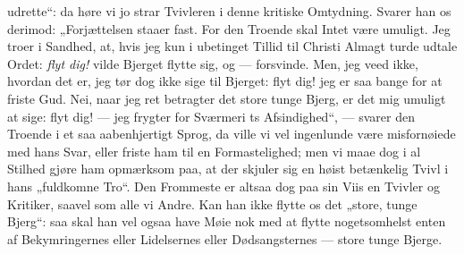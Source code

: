 \documentclass[12pt,a4paper]{book}
\begin{document}
udrette“: da høre vi jo strar Tvivleren i denne kritiske Omtydning. Svarer han os
derimod: „Forjættelsen staaer fast. For den Troende skal Intet være umuligt. Jeg troer i
Sandhed, at, hvis jeg kun i ubetinget Tillid til Christi Almagt turde udtale Ordet:
\emph{flyt dig!} vilde Bjerget flytte sig, og --- forsvinde. Men, jeg veed ikke, hvordan
det er, jeg tør dog ikke sige til Bjerget: flyt dig! jeg er saa bange for at friste Gud.
Nei, naar jeg ret betragter det store tunge Bjerg, er det
mig umuligt at sige: flyt dig! --- jeg frygter for Sværmeri ts Afsindighed“, --- svarer
den Troende i et saa aabenhjertigt Sprog, da ville vi vel ingenlunde være misfornøiede
med hans Svar, eller friste ham til en Formastelighed; men vi maae dog i al Stilhed
gjøre ham opmærksom paa, at der skjuler sig en høist betænkelig Tvivl i hans „fuldkomne
Tro“. Den Frommeste er altsaa dog paa sin Viis en Tvivler og Kritiker, saavel som alle
vi Andre. Kan han ikke flytte os det „store, tunge Bjerg“: saa skal han vel ogsaa have
Møie nok med at flytte nogetsomhelst enten af Bekymringernes eller Lidelsernes eller
Dødsangsternes --- store tunge Bjerge.
\end{document}
